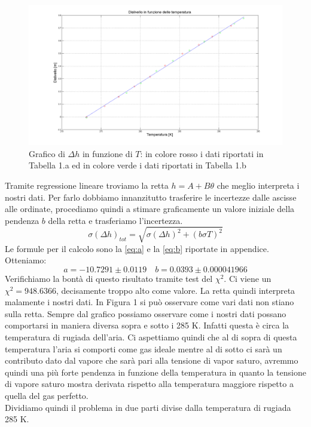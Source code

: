 \begin{figure}[H]
\centering
\includegraphics[width=\textwidth]{img/1}
\caption{Grafico di $\Delta h$ in funzione di $T$: in colore rosso i dati riportati in Tabella 1.a ed in colore verde i dati riportati in Tabella 1.b}
\end{figure}

Tramite regressione lineare troviamo la retta $h = A+B\theta$ che meglio interpreta i nostri dati. 
Per farlo dobbiamo innanzitutto trasferire le incertezze dalle ascisse alle ordinate, procediamo quindi a stimare graficamente un valore iniziale della pendenza $b$ della retta e trasferiamo l'incertezza.
\begin{equation}
\sigma(\Delta h)_{tot} = \sqrt{\sigma(\Delta h)^2 + (b\sigma T)^2}
\end{equation}
Le formule per il calcolo sono la \eqref{eq:a} e la \eqref{eq:b} riportate in appendice. Otteniamo:
\[a =-10.7291 \pm 0.0119 \quad  b= 0.0393\pm  0.000041966\]
Verifichiamo la bontà di questo risultato tramite test del $\chi^2$. Ci viene un $\chi^2=948.6366$, decisamente troppo alto come valore.
La retta quindi interpreta malamente i nostri dati. In Figura 1 si può osservare come vari dati non stiano sulla retta. Sempre dal grafico possiamo osservare come i nostri dati possano comportarsi in maniera diversa sopra e sotto i 285 K. Infatti questa è circa la temperatura di rugiada dell'aria. Ci aspettiamo quindi che al di sopra di questa temperatura l'aria si comporti come gas ideale mentre al di sotto ci sarà un contributo dato dal vapore che sarà pari alla tensione di vapor saturo, avremmo quindi una più forte pendenza in funzione della temperatura in quanto la tensione di vapore saturo mostra derivata rispetto alla temperatura maggiore rispetto a quella del gas perfetto.\\
\newline
Dividiamo quindi il problema in due parti divise dalla temperatura di rugiada 285 K.

